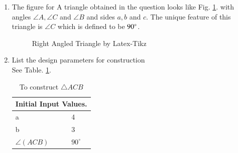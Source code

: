 \renewcommand{\theequation}{\theenumi}
\begin{enumerate}[label=\thesection.\arabic*.,ref=\thesection.\theenumi]
\item The figure for A triangle obtained in the question looks like Fig. \ref{fig:tri_right_angle}.
with angles $\angle A,\angle C$ and $\angle B$ and sides $a, b$ and $c$.  The unique feature of this triangle is $\angle C$ which is defined to be $90\degree$.


\begin{figure}[!ht]
\centering
\resizebox{\columnwidth}{!}{}
\caption{Right Angled Triangle by Latex-Tikz}
\label{fig:tri_right_angle}	
\end{figure}
%
%
%
\item List the design parameters for construction
\label{const:table1}
\\
\solution See Table. \ref{table:table1}. 
%
\begin{table}[ht!]
\centering
\begin{tabular}{ |p{3cm}|p{3cm}|  }
\hline
 \multicolumn{2}{|c|}{Initial Input Values.} \\
\hline
a & 4\\
\hline
b & 3\\
\hline
$\angle(ACB)$ & $90^{\circ}$ \\
\hline
\end{tabular}
\caption{To construct $\triangle ACB$}
\label{table:table1}	
\end{table}


\end{enumerate}

